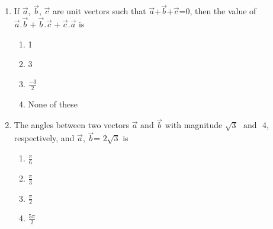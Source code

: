 \begin{enumerate}[label=\thesection.\arabic*,ref=\thesection.\theenumi]
\item If $\vec{a}$, $\vec{b}$, $\vec{c}$ are unit vectors such that $\vec{a}$+$\vec{b}$+$\vec{c}$=0, then the value of $\vec{a}.\vec{b}+\vec{b}.\vec{c}+\vec{c}.\vec{a}$ is
	\begin{enumerate}
\item 1
\item 3
\item $\frac{-3}{2}$
\item None of these
\end{enumerate}
\item The angles between two vectors $\vec{a}$ $\text{and}$ $\vec{b}$ with magnitude $\sqrt{3}$ $\text{ and }$ 4, respectively, and $\vec{a}$, $\vec{b}$= $2\sqrt{3}$ is
	\begin{enumerate}
\item $\frac{\pi}{6}$
\item $\frac{\pi}{3}$
\item $\frac{\pi}{2}$ 
\item $\frac{5\pi}{2}$
\end{enumerate}


\end{enumerate}
